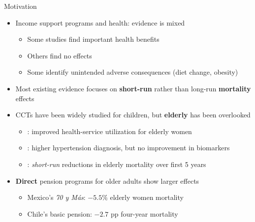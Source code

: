 \documentclass[aspectratio=169,usenames,dvipsnames]{beamer}
\newcommand{\smallcite}[1]{{\footnotesize\textcolor{Blue}{\citep{#1}}}}
\begin{document}
\begin{frame}{Motivation}\label{motivation}
\vspace{2pt}
\small
\begin{itemize}
  \item[$\circ$] Income support programs and health: evidence is mixed
    \begin{itemize}
      \item Some studies find important health benefits \smallcite{Case2004PerspectivesAging, Aguila2015PNAS}
      \item Others find no effects \smallcite{LloydSherlockAgrawal2014JDS}
      \item Some identify unintended adverse consequences (diet change, obesity) \smallcite{FernaldGertlerHou2008JN}
    \end{itemize}
  \vspace{4pt}
  \item[$\circ$] Most existing evidence focuses on \textbf{short-run} rather than long-run \textbf{mortality} effects
  \vspace{4pt}
  \item[$\circ$] CCTs have been widely studied for children, but \textbf{elderly} has been overlooked
    \begin{itemize}
      \item \smallcite{BehrmanParker2013Demography}: improved health-service utilization for elderly women
      \item \smallcite{aguila2024conditional}: higher hypertension diagnosis, but no improvement in biomarkers
      \item \smallcite{BarhamRowberry2013JDE}: \textit{short-run} reductions in elderly mortality over first 5 years
    \end{itemize}
  \vspace{4pt}
  \item[$\circ$] \textbf{Direct} pension programs for older adults show larger effects
    \begin{itemize}
      \item Mexico's \textit{70 y Más}: $-5.5\%$ elderly women mortality \smallcite{menares}
      \item Chile's basic pension: $-2.7$ pp four-year mortality \smallcite{MiglinoNavarrete2023AEJP}
    \end{itemize}
\end{itemize}
\end{frame}

\end{document}
